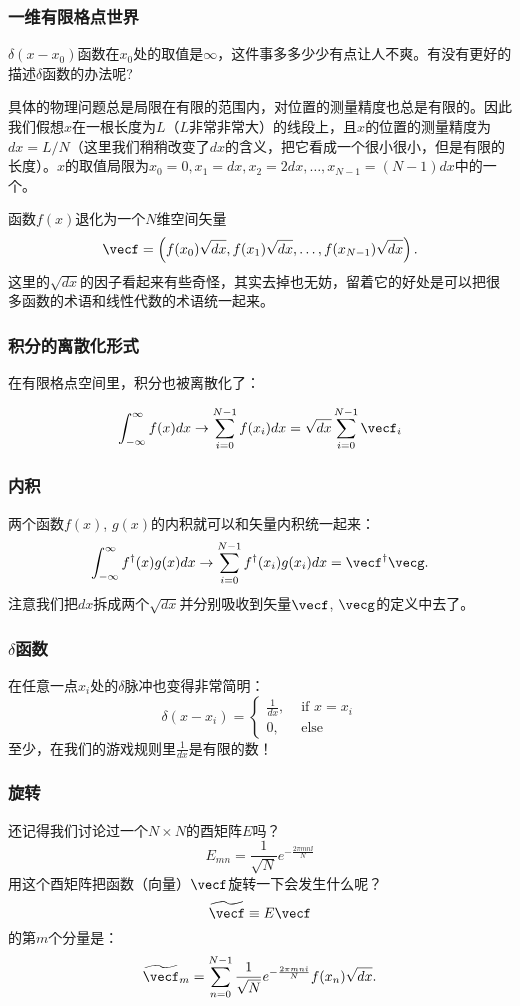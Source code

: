 \documentclass[CJK,13pt]{beamer}
\begin{document}
\begin{frame}
  \frametitle{一维有限格点世界}
  $\delta(x-x_0)$函数在$x_0$处的取值是$\infty$，这件事多多少少有点让人不爽。有没有更好的描述$\delta$函数的办法呢?

  具体的物理问题总是局限在有限的范围内，对位置的测量精度也总是有限的。因此我们假想$x$在一根长度为$L$（$L$非常非常大）的线段上，且$x$的位置的测量精度为$dx=L/N$（这里我们稍稍改变了$dx$的含义，把它看成一个很小很小，但是有限的长度）。$x$的取值局限为$x_0=0, x_1=dx, x_2=2dx, \ldots, x_{N-1}=(N-1)dx$中的一个。

  {\blue 函数$f(x)$退化为一个$N$维空间矢量
    $$ \vecf = \left( f(x_0) \sqrt{dx}, f(x_1) \sqrt{dx},\ldots, f(x_{N-1})\sqrt{dx} \right).$$}
    这里的$\sqrt{dx}$的因子看起来有些奇怪，其实去掉也无妨，留着它的好处是可以把很多函数的术语和线性代数的术语统一起来。

\end{frame}


\begin{frame}
  \frametitle{积分的离散化形式}

  在有限格点空间里，积分也被离散化了：

  $$\int_{-\infty}^{\infty} f(x) dx \rightarrow \sum_{i=0}^{N-1} f(x_i) dx = \sqrt{dx} \sum_{i=0}^{N-1} \vecf_{i} $$
\end{frame}


\begin{frame}
  \frametitle{内积}
  两个函数$f(x)$, $g(x)$的内积就可以和矢量内积统一起来：
  $$ \int_{-\infty}^\infty f^\dagger(x) g(x) dx \rightarrow \sum_{i=0}^{N-1} f^\dagger(x_i)g(x_i) dx  = \vecf^\dagger\vecg. $$
  注意我们把$dx$拆成两个$\sqrt{dx}$并分别吸收到矢量$\vecf$, $\vecg$的定义中去了。
\end{frame}

\begin{frame}
  \frametitle{$\delta$函数}
  在任意一点$x_i$处的$\delta$脉冲也变得非常简明：
  $$\delta(x-x_i) = \left\{\begin{array}{ll}\frac{1}{dx}, &\text{ if }x=x_i \\
  0, & \text{ else}\end{array}\right.$$
  至少，在我们的游戏规则里$\frac{1}{dx}$是有限的数！
\end{frame}

\begin{frame}
  \frametitle{旋转}
  还记得我们讨论过一个$N\times N$的酉矩阵$E$吗？
  $$E_{mn} = \frac{1}{\sqrt{N}}e^{-\frac{2\pi mn \ii }{N}}$$
  用这个酉矩阵把函数（向量）$\vecf$旋转一下会发生什么呢？
  $$ \widetilde{\vecf} \equiv E\vecf$$
  的第$m$个分量是：
  $$ \widetilde{\vecf}_m = \sum_{n=0}^{N-1} \frac{1}{\sqrt{N}}e^{-\frac{2\pi mn \ii }{N}} f(x_n)\sqrt{dx}. $$
\end{frame}
\end{document}
